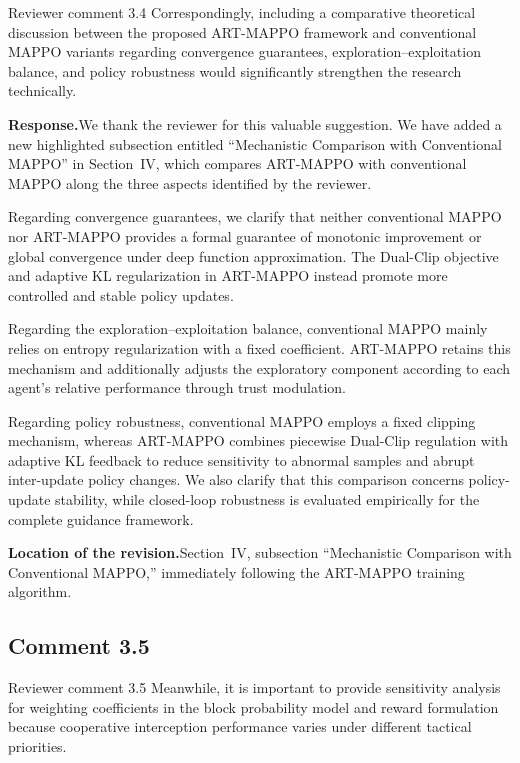 \documentclass[11pt]{article}
\newcommand{\rsp}{\medskip\noindent\textbf{Response.}\quad}
\newcommand{\loc}{\medskip\noindent\textbf{Location of the revision.}\quad}
\begin{document}
\begin{reviewercomment}{Reviewer comment 3.4}
Correspondingly, including a comparative theoretical discussion between the
proposed ART-MAPPO framework and conventional MAPPO variants regarding
convergence guarantees, exploration--exploitation balance, and policy
robustness would significantly strengthen the research technically.
\end{reviewercomment}

\rsp We thank the reviewer for this valuable suggestion. We have added a new
highlighted subsection entitled ``Mechanistic Comparison with Conventional
MAPPO'' in Section~IV, which compares ART-MAPPO with conventional MAPPO along
the three aspects identified by the reviewer.

Regarding convergence guarantees, we clarify that neither conventional MAPPO
nor ART-MAPPO provides a formal guarantee of monotonic improvement or global
convergence under deep function approximation. The Dual-Clip objective and
adaptive KL regularization in ART-MAPPO instead promote more controlled and
stable policy updates.

Regarding the exploration--exploitation balance, conventional MAPPO mainly
relies on entropy regularization with a fixed coefficient. ART-MAPPO retains
this mechanism and additionally adjusts the exploratory component according to
each agent's relative performance through trust modulation.

Regarding policy robustness, conventional MAPPO employs a fixed clipping
mechanism, whereas ART-MAPPO combines piecewise Dual-Clip regulation with
adaptive KL feedback to reduce sensitivity to abnormal samples and abrupt
inter-update policy changes. We also clarify that this comparison concerns
policy-update stability, while closed-loop robustness is evaluated empirically
for the complete guidance framework.

\loc Section~IV, subsection ``Mechanistic Comparison with Conventional MAPPO,''
immediately following the ART-MAPPO training algorithm.



\subsection*{Comment 3.5}

\begin{reviewercomment}{Reviewer comment 3.5}
Meanwhile, it is important to provide sensitivity analysis for weighting coefficients
in the block probability model and reward formulation because cooperative interception
performance varies under different tactical priorities.
\end{reviewercomment}
\end{document}
